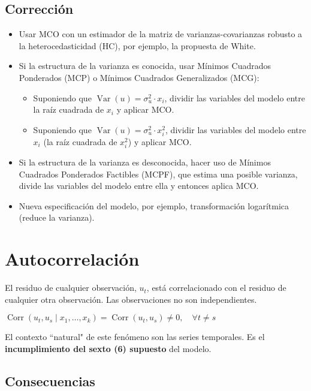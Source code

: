 \documentclass[10pt, a4paper, landscape]{article}
\DeclareMathOperator{\Var}{Var}
\DeclareMathOperator{\Corr}{Corr}
\begin{document}
\begin{multicols}{3}
\subsection*{Corrección}

\begin{itemize}[leftmargin=*]
	\item Usar MCO con un estimador de la matriz de varianzas-covarianzas robusto a la heterocedasticidad (HC), por ejemplo, la propuesta de White.
	\item Si la estructura de la varianza es conocida, usar Mínimos Cuadrados Ponderados (MCP) o Mínimos Cuadrados Generalizados (MCG):
	\begin{itemize}[leftmargin=*]
		\item Suponiendo que \( \Var(u) = \sigma_{u}^{2} \cdot x_{i} \), dividir las variables del modelo entre la raíz cuadrada de \( x_{i} \) y aplicar MCO.
		\item Suponiendo que \( \Var(u) = \sigma_{u}^{2} \cdot x_{i}^{2} \), dividir las variables del modelo entre \( x_{i} \) (la raíz cuadrada de \( x_{i}^{2} \)) y aplicar MCO.
	\end{itemize}
	\item Si la estructura de la varianza es desconocida, hacer uso de Mínimos Cuadrados Ponderados Factibles (MCPF), que estima una posible varianza, divide las variables del modelo entre ella y entonces aplica MCO.
	\item Nueva especificación del modelo, por ejemplo, transformación logarítmica (reduce la varianza).
\end{itemize}

\columnbreak

\section*{Autocorrelación}

El residuo de cualquier observación, $u_{t}$, está correlacionado con el residuo de cualquier otra observación. Las observaciones no son independientes.

\begin{center}
	\( \Corr(u_{t}, u_{s} \mid x_{1}, \ldots, x_{k}) = \Corr(u_{t}, u_{s}) \neq 0, \quad \forall t \neq s \)
\end{center}

El contexto ``natural" de este fenómeno son las series temporales. Es el \textbf{incumplimiento del sexto (6) supuesto} del modelo.

\subsection*{Consecuencias}


\end{multicols}
\end{document}
